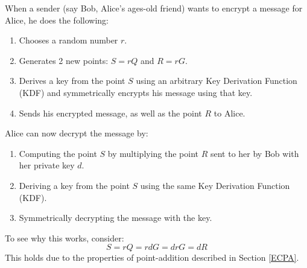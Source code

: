 When a sender (say Bob, Alice's ages-old friend) wants to encrypt a message for Alice, he does the following:
\begin{enumerate}
\item Chooses a random number $r$.
\item Generates 2 new points: $S=rQ$ and $R=rG$.
\item Derives a key from the point $S$ using an arbitrary Key Derivation Function (KDF) and symmetrically encrypts his message using that key.
\item Sends his encrypted message, as well as the point $R$ to Alice.
\end{enumerate}
Alice can now decrypt the message by:
\begin{enumerate}
\item Computing the point $S$ by multiplying the point $R$ sent to her by Bob with her private key $d$.
\item Deriving a key from the point $S$ using the same Key Derivation Function (KDF).
\item Symmetrically decrypting the message with the key.
\end{enumerate}
To see why this works, consider:
\[S=rQ=rdG=drG=dR\]
This holds due to the properties of point-addition described in Section \ref{ECPA}. 
\newpage







